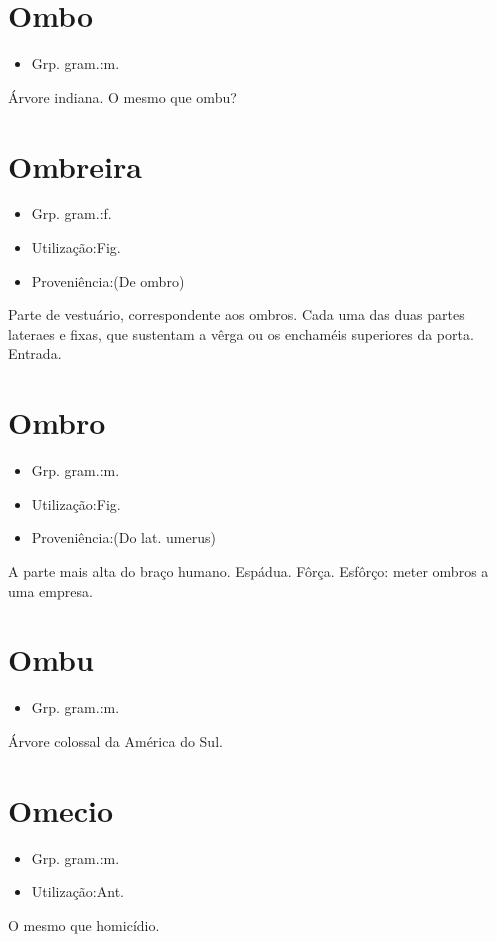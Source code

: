 \section{Ombo}
\begin{itemize}
\item {Grp. gram.:m.}
\end{itemize}
Árvore indiana.
O mesmo que \textunderscore ombu\textunderscore ?
\section{Ombreira}
\begin{itemize}
\item {Grp. gram.:f.}
\end{itemize}
\begin{itemize}
\item {Utilização:Fig.}
\end{itemize}
\begin{itemize}
\item {Proveniência:(De \textunderscore ombro\textunderscore )}
\end{itemize}
Parte de vestuário, correspondente aos ombros.
Cada uma das duas partes lateraes e fixas, que sustentam a vêrga ou os enchaméis superiores da porta.
Entrada.
\section{Ombro}
\begin{itemize}
\item {Grp. gram.:m.}
\end{itemize}
\begin{itemize}
\item {Utilização:Fig.}
\end{itemize}
\begin{itemize}
\item {Proveniência:(Do lat. \textunderscore umerus\textunderscore )}
\end{itemize}
A parte mais alta do braço humano.
Espádua.
Fôrça.
Esfôrço: \textunderscore meter ombros a uma empresa\textunderscore .
\section{Ombu}
\begin{itemize}
\item {Grp. gram.:m.}
\end{itemize}
Árvore colossal da América do Sul.
\section{Omecio}
\begin{itemize}
\item {Grp. gram.:m.}
\end{itemize}
\begin{itemize}
\item {Utilização:Ant.}
\end{itemize}
O mesmo que \textunderscore homicídio\textunderscore .
